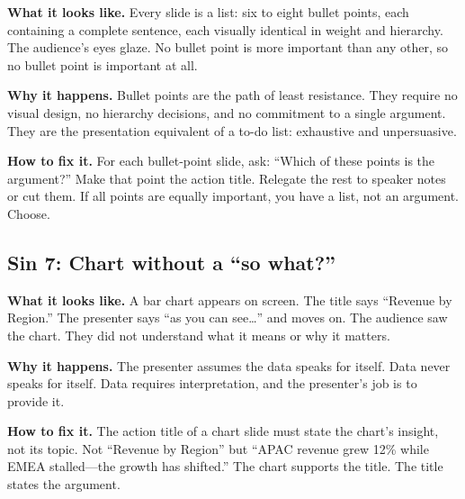 \textbf{What it looks like.} Every slide is a list: six to eight bullet points, each containing a complete sentence, each visually identical in weight and hierarchy. The audience's eyes glaze. No bullet point is more important than any other, so no bullet point is important at all.

\textbf{Why it happens.} Bullet points are the path of least resistance. They require no visual design, no hierarchy decisions, and no commitment to a single argument. They are the presentation equivalent of a to-do list: exhaustive and unpersuasive.

\textbf{How to fix it.} For each bullet-point slide, ask: ``Which of these points is the argument?'' Make that point the action title. Relegate the rest to speaker notes or cut them. If all points are equally important, you have a list, not an argument. Choose.


\subsection{Sin 7: Chart without a ``so what?''}

\textbf{What it looks like.} A bar chart appears on screen. The title says ``Revenue by Region.'' The presenter says ``as you can see\ldots'' and moves on. The audience saw the chart. They did not understand what it means or why it matters.

\textbf{Why it happens.} The presenter assumes the data speaks for itself. Data never speaks for itself. Data requires interpretation, and the presenter's job is to provide it.

\textbf{How to fix it.} The action title of a chart slide must state the chart's insight, not its topic. Not ``Revenue by Region'' but ``APAC revenue grew 12\% while EMEA stalled---the growth has shifted.'' The chart supports the title. The title states the argument.

